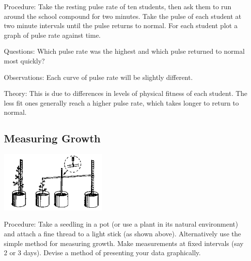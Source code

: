 \begin{multicols}{2}
\begin{description*}
\item[Procedure:]{Take the resting pulse rate of ten students, then ask them to run around the school
compound for two minutes. Take the pulse of each student at two minute intervals until the
pulse returns to normal. For each student plot a graph of pulse rate against time.}
\item[Questions:]{Which pulse rate was the highest and which pulse returned to normal most quickly?}
\item[Observations:]{Each curve of pulse rate will be slightly different.}
\item[Theory:]{This is due to differences in levels of physical fitness of each student. The less fit ones
generally reach a higher pulse rate, which takes longer to return to normal.}
\end{description*}

\subsection{Measuring Growth}

\begin{center}
\includegraphics[width=0.4\textwidth]{./img/source/data-growth.png}
\end{center}

\begin{description*}
\item[Procedure:]{Take a seedling in a pot (or use a plant in its natural environment) and attach a fine thread
to a light stick (as shown above). Alternatively use the simple method for measuring growth.
Make measurements at fixed intervals (say 2 or 3 days). Devise a method of presenting your
data graphically.}
\end{description*}


\end{multicols}
